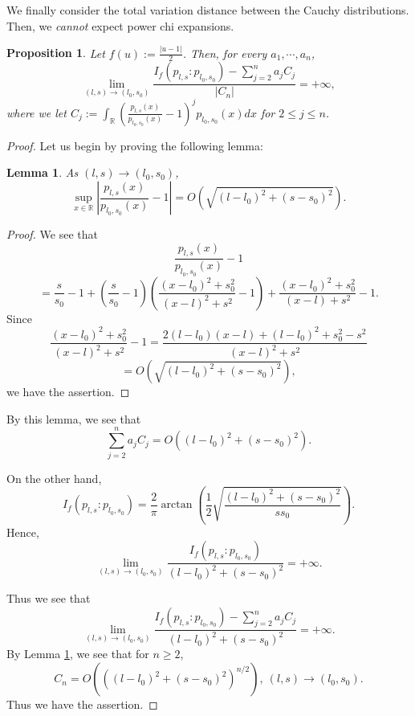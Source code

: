 \documentclass[journal]{IEEEtran}
\newtheorem{lemma}[theorem]{Lemma}
\newtheorem{proposition}[theorem]{Proposition}
\begin{document}
 
We finally consider the total variation distance between the Cauchy distributions. 
Then, we {\it cannot} expect power chi expansions. 

\begin{proposition}
Let $f(u) := \frac{|u-1|}{2}$. 
Then, for every $a_1, \cdots, a_n$, 
\[ \lim_{(l,s)\to (l_0, s_0)} \frac{I_f (p_{l,s}:p_{l_0, s_0}) - \sum_{j=2}^{n} a_j C_j}{\left| C_n \right|} = +\infty, \]
where we let $C_j := \int_{\mathbb R} \left( \frac{p_{l, s}(x)}{p_{l_0, s_0}(x)} - 1 \right)^j p_{l_0, s_0}(x) dx$ for $2 \le j \le n$. 
\end{proposition}

\begin{proof}
Let us begin by proving the following lemma:

\begin{lemma}\label{sup-ratio-Cauchy}
As $(l,s)\to (l_0, s_0)$, 
\[ \sup_{x \in \mathbb R} \left| \frac{p_{l, s}(x)}{p_{l_0, s_0}(x)} - 1 \right| = O\left( \sqrt{(l - l_0)^2 + (s - s_0)^2} \right). \]
\end{lemma}

\begin{proof}
We see that 
\[ \frac{p_{l, s}(x)}{p_{l_0, s_0}(x)} - 1 \]
\[= \frac{s}{s_0} - 1 + \left(\frac{s}{s_0} - 1\right) \left(\frac{(x - l_0)^2 + s_0^2}{(x - l)^2 + s^2}  -1 \right) + \frac{(x - l_0)^2 + s_0^2}{(x - l) + s^2}  - 1.   \]
Since 
\[ \frac{(x - l_0)^2 + s_0^2}{(x - l)^2 + s^2}  - 1 = \frac{2 (l - l_0) (x - l) + (l - l_0)^2 + s_0^2 - s^2}{(x - l)^2 + s^2}\]
\[ = O\left( \sqrt{(l - l_0)^2 + (s - s_0)^2} \right), \]
we have the assertion. 
\end{proof}

By this lemma, we see that 
\[  \sum_{j=2}^{n} a_j C_j = O\left( (l - l_0)^2 + (s - s_0)^2 \right). \]

On the other hand, 
\[ I_f (p_{l,s}:p_{l_0, s_0}) = \frac{2}{\pi} \arctan\left( \frac{1}{2} \sqrt{\frac{(l - l_0)^2 + (s -s_0)^2}{s s_0}} \right). \]
Hence, 
\[ \lim_{(l,s)\to (l_0, s_0)} \frac{I_f (p_{l,s}:p_{l_0, s_0})}{(l - l_0)^2 + (s - s_0)^2} =+\infty. \]

Thus we see that 
\[ \lim_{(l,s)\to (l_0, s_0)} \frac{I_f (p_{l,s}:p_{l_0, s_0}) - \sum_{j=2}^{n} a_j C_j}{(l - l_0)^2 + (s - s_0)^2} = +\infty. \]
By Lemma \ref{sup-ratio-Cauchy}, 
we see that for $n \ge 2$, 
\[ C_n = O\left( \left((l - l_0)^2 + (s - s_0)^2 \right)^{n/2} \right), \ (l,s)\to (l_0, s_0).  \]
Thus we have the assertion. 
\end{proof}
\end{document}
